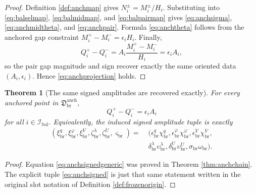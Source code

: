 \documentclass[11pt]{article}
\newcommand{\DeepReadAmp}{\xi_{\mathrm{br}}^{q}}
\newcommand{\DeepCovAmp}{\xi_{\mathrm{br}}^{\varphi}}
\newcommand{\DeepRelaxAmp}{\xi_{\mathrm{br}}^{V}}
\newcommand{\DeepWellAmp}{\zeta_{\mathrm{br}}^{\lambda}}
\newcommand{\DeepEqAmp}{\zeta_{\mathrm{br}}^{U}}
\newcommand{\DeepScaleAmp}{\varsigma_{\mathrm{br}}}
\newcommand{\AbsReadAmp}{\chi_{\mathrm{br}}^{q}}
\newcommand{\AbsCovAmp}{\chi_{\mathrm{br}}^{\varphi}}
\newcommand{\AbsRelaxAmp}{\chi_{\mathrm{br}}^{V}}
\newcommand{\AbsWellAmp}{\upsilon_{\mathrm{br}}^{\lambda}}
\newcommand{\AbsEqAmp}{\upsilon_{\mathrm{br}}^{U}}
\newcommand{\AbsScaleAmp}{\omega_{\mathrm{br}}}
\newcommand{\PolRead}{\epsilon_{\mathrm{br}}^{q}}
\newcommand{\PolCov}{\epsilon_{\mathrm{br}}^{\varphi}}
\newcommand{\PolRelax}{\epsilon_{\mathrm{br}}^{V}}
\newcommand{\PolWell}{\delta_{\mathrm{br}}^{\lambda}}
\newcommand{\PolEq}{\delta_{\mathrm{br}}^{U}}
\newcommand{\PolScale}{\sigma_{\mathrm{br}}}
\newcommand{\BalOriginSector}{\mathfrak D_{\mathrm{br}}^{\mathrm{anch}}}
\newcommand{\BalIndex}{\mathcal I_{\mathrm{bal}}}
\newtheorem{theorem}{Theorem}
\begin{document}
\begin{proof}
Definition \ref{def:anchmap} gives \(N_i^\pm=M_i^\pm/H_i\). Substituting into \eqref{eq:balselmap}, \eqref{eq:balmidmap}, and \eqref{eq:balpairmap} gives \eqref{eq:anchsigma}, \eqref{eq:anchmidtheta}, and \eqref{eq:anchpair}. Formula \eqref{eq:anchtheta} follows from the anchored gap constraint \(M_i^+-M_i^-=\epsilon_i H_i\). Finally,
\[
Q_i^+-Q_i^-
=
A_i\frac{M_i^+-M_i^-}{H_i}
=
\epsilon_i A_i,
\]
so the pair gap magnitude and sign recover exactly the same oriented data \((A_i,\epsilon_i)\). Hence \eqref{eq:anchprojection} holds.
\end{proof}

\begin{theorem}[The same signed amplitudes are recovered exactly]
\label{thm:anchsigned}
For every anchored point in \(\BalOriginSector\),
\begin{equation}
Q_i^+-Q_i^-=\epsilon_i A_i
\label{eq:anchsignedgeneric}
\end{equation}
for all \(i\in\BalIndex\). Equivalently, the induced signed amplitude tuple is exactly
\begin{align}
(\DeepReadAmp,\DeepCovAmp,\DeepRelaxAmp,\DeepWellAmp,\DeepEqAmp,\DeepScaleAmp)
=\;&
(\PolRead\AbsReadAmp,\PolCov\AbsCovAmp,\PolRelax\AbsRelaxAmp,
\nonumber\\
&\PolWell\AbsWellAmp,\PolEq\AbsEqAmp,\PolScale\AbsScaleAmp).
\label{eq:anchsigned}
\end{align}
\end{theorem}

\begin{proof}
Equation \eqref{eq:anchsignedgeneric} was proved in Theorem \ref{thm:anchchain}. The explicit tuple \eqref{eq:anchsigned} is just that same statement written in the original slot notation of Definition \ref{def:frozenorigin}.
\end{proof}
\end{document}
